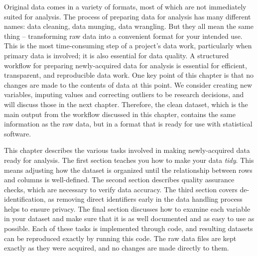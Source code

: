 \documentclass[
]{book}
\begin{document}
Original data comes in a variety of formats,
most of which are not immediately suited for analysis.
The process of preparing data for analysis has many different names:
data cleaning, data munging, data wrangling.
But they all mean the same thing --
transforming raw data into a convenient format for your intended use.
This is the most time-consuming step of a project's data work,
particularly when primary data is involved;
it is also essential for data quality.
A structured workflow for preparing newly-acquired data for analysis
is essential for efficient, transparent, and reproducible data work.
One key point of this chapter is that no changes are made to the contents of data at this point.
We consider creating new variables, imputing values and correcting outliers
to be research decisions, and will discuss those in the next chapter.
Therefore, the clean dataset,
which is the main output from the workflow discussed in this chapter,
contains the same information as the raw data,
but in a format that is ready for use with statistical software.

This chapter describes the various tasks involved in making newly-acquired data ready for analysis.
The first section teaches you how to make your data \emph{tidy}.
This means adjusting how the dataset is organized
until the relationship between rows and columns is well-defined.
The second section describes quality assurance checks,
which are necessary to verify data accuracy.
The third section covers de-identification,
as removing direct identifiers early in the data handling process helps to ensure privacy.
The final section discusses how to examine each variable in your dataset and
make sure that it is as well documented and as easy to use as possible.
Each of these tasks is implemented through code,
and resulting datasets can be reproduced exactly by running this code.
The raw data files are kept exactly as they were acquired,
and no changes are made directly to them.
\end{document}

